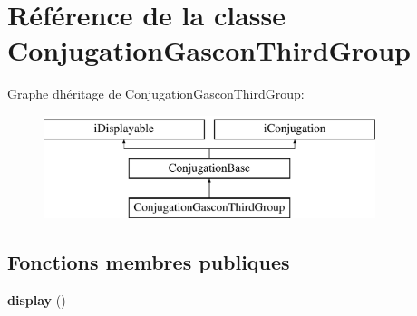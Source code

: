 \hypertarget{classConjugationGasconThirdGroup}{}\section{Référence de la classe Conjugation\+Gascon\+Third\+Group}
\label{classConjugationGasconThirdGroup}
Graphe d\textquotesingle{}héritage de Conjugation\+Gascon\+Third\+Group\+:\begin{figure}[H]
\begin{center}
\leavevmode
\includegraphics[height=3.000000cm]{classConjugationGasconThirdGroup}
\end{center}
\end{figure}
\subsection*{Fonctions membres publiques}
\begin{DoxyCompactItemize}
\item 
\hypertarget{classConjugationGasconThirdGroup_aded79025318b9257b1e78eb56b83408a}{}\label{classConjugationGasconThirdGroup_aded79025318b9257b1e78eb56b83408a} 
{\bfseries display} ()
\end{DoxyCompactItemize}
